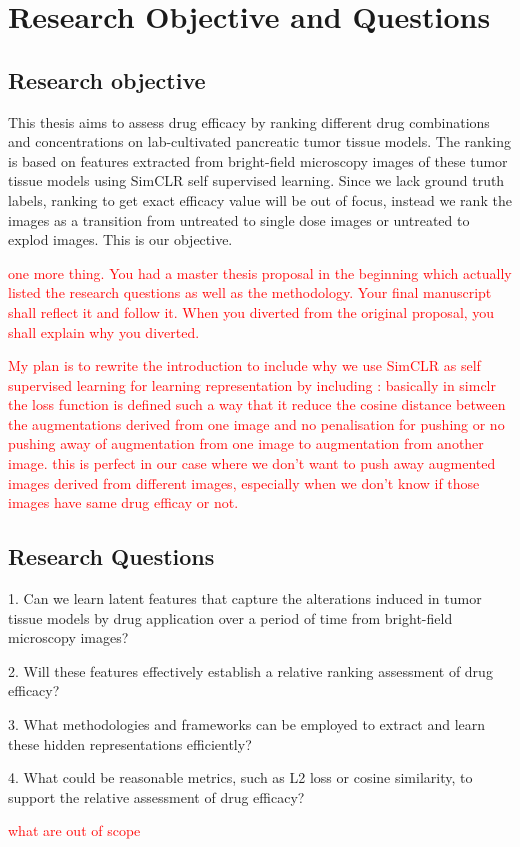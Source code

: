 \chapter{Research Objective and Questions}\label{ch:Research Objectives and Questions}
\section*{Research objective}
This thesis aims to assess drug efficacy by ranking different drug combinations and concentrations on lab-cultivated pancreatic tumor tissue models. 
The ranking is based on features extracted from bright-field microscopy images of these tumor tissue models using
SimCLR self supervised learning. Since we lack ground truth labels, ranking to get exact efficacy value will be out of focus, instead we rank the images as a transition from
 untreated to single dose images or untreated to explod images. This is our objective.  


 \textcolor{red}{one more thing. You had a master thesis proposal in the beginning which actually listed the research questions as well as the methodology. 
 Your final manuscript shall reflect it and follow it. When you diverted from the original proposal, you shall explain why you diverted.} 


\textcolor{red}{My plan is to rewrite the introduction to include why we use SimCLR as self supervised learning for learning representation by including :
 basically in simclr the loss function is defined such a way that it reduce the cosine distance between the augmentations derived from one image  and no 
 penalisation for pushing or no pushing away of augmentation from one image to augmentation from another image. this is perfect in our case where 
 we don't want to push away augmented images derived from different images, especially when we don't know if those images have same drug efficay or not.}

\section*{Research Questions}

1. Can we learn latent features that capture the alterations induced in tumor tissue models by drug application over a period of time from bright-field microscopy images?

2. Will these features effectively establish a relative ranking assessment of drug efficacy?

3. What methodologies and frameworks can be employed to extract and learn these hidden representations efficiently?

4. What could be reasonable metrics, such as L2 loss or cosine similarity, to support the relative assessment of drug efficacy?


\textcolor{red}{what are out of scope}

